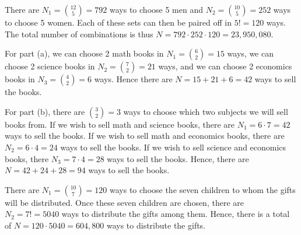 \documentclass[a4paper,12pt]{article}
\begin{document}
\vspace{2mm}
There are $N_1 = \binom{12}{5} = 792$ ways to choose 5 men and $N_2 = \binom{10}{5} = 252$ ways to choose 5 women. Each of these sets can then be paired off in $5! = 120$ ways. The total number of combinations is thus $N = 792 \cdot 252 \cdot 120 = 23,950,080$.

\vspace{4mm}

\vspace{2mm}
For part (a), we can choose 2 math books in $N_1 = \binom{6}{2} = 15$ ways, we can choose 2 science books in $N_2 = \binom{7}{2} = 21$ ways, and we can choose 2 economics books in $N_3 = \binom{4}{2} = 6$ ways. Hence there are $N = 15 + 21 + 6 = 42$ ways to sell the books. 

For part (b), there are $\binom{3}{2} = 3$ ways to choose which two subjects we will sell books from.  If we wish to sell math and science books, there are $N_1 = 6 \cdot 7 = 42$ ways to sell the books. If we wish to sell math and economics books, there are $N_2 = 6 \cdot 4 = 24$ ways to sell the books. If we wish to sell science and economics books, there $N_3=  7 \cdot 4 = 28$ ways to sell the books. Hence, there are $N = 42 + 24 + 28 = 94$ ways to sell the books. 

\pagebreak
{}

\vspace{2mm}
There are $N_1 = \binom{10}{7} = 120$ ways to choose the seven children to whom the gifts will be distributed. Once these seven children are chosen, there are $N_2 = 7! = 5040$ ways to distribute the gifts among them. Hence, there is a total of $N = 120 \cdot 5040 = 604,800$ ways to distribute the gifts. 
\end{document}
